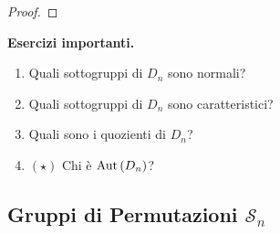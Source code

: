 \begin{multicols}{2}
\begin{proof}
\end{proof}

\textbf{Esercizi importanti.}
\begin{enumerate}
	\item Quali sottogruppi di $ D_n $ sono normali?
	\item Quali sottogruppi di $ D_n $ sono caratteristici?
	\item Quali sono i quozienti di $ D_n $?
	\item $ (\star) $ Chi è $ \mathrm{Aut}\left( D_n \right) $?
\end{enumerate}

\end{multicols}

\subsection{Gruppi di Permutazioni $ \mathcal{S}_n $}
